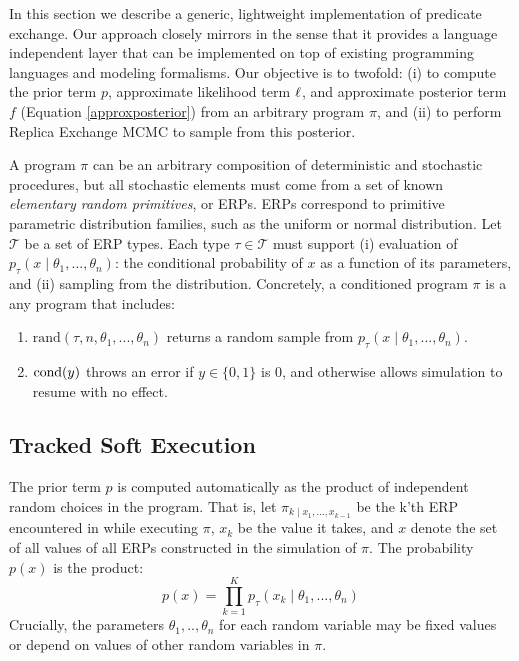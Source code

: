
In this section we describe a generic, lightweight implementation of predicate exchange.
Our approach closely mirrors \citep{wingate2011lightweight, milch20071} in the sense that it provides a language independent layer that can be implemented on top of existing programming languages and modeling formalisms.
Our objective is to twofold: (i) to compute the prior term $p$, approximate likelihood term $\operatorname{\ell}$, and approximate posterior term $f$ (Equation \ref{approxposterior}) from an arbitrary program $\pi$, and (ii) to perform Replica Exchange MCMC to sample from this posterior.

A program $\pi$ can be an arbitrary composition of deterministic and stochastic procedures, but all stochastic elements must come from a set of known \emph{elementary random primitives}, or ERPs.
ERPs correspond to primitive parametric distribution families, such as the uniform or normal distribution.
Let $\mathcal{T}$ be a set of ERP types.
Each type $\tau \in \mathcal{T}$ must support (i) evaluation of $p_\tau(x \mid \theta_1, ..., \theta_n)$: the conditional probability of $x$ as a function of its parameters, and (ii) sampling from the distribution.
Concretely, a conditioned program $\pi$ is a any program that includes:

\begin{enumerate}
  \item $\textrm{rand}(\tau, n, \theta_1, ...,\theta_n)$ returns a random sample from $p_\tau(x \mid \theta_1, ..., \theta_n)$.
  \item $\operatorname{cond}(y)$ throws an error if $y \in \{0, 1\}$ is 0, and otherwise allows simulation to resume with no effect.
\end{enumerate}



\subsection{Tracked Soft Execution}
The prior term $p$ is computed automatically as the product of independent random choices in the program. 
That is, let $\pi_{k \mid x_1, ..., x_{k-1}}$ be the k'th ERP encountered in while executing $\pi$, $x_k$ be the value it takes, and $x$ denote the set of all values of all ERPs constructed in the simulation of $\pi$.
The probability $p(x)$ is the product:
\begin{equation}\label{productprob}
p(x) = \prod_{k=1}^K p_\tau(x_k \mid \theta_1,..., \theta_n )
\end{equation}
Crucially, the parameters $\theta_1,..,\theta_n$ for each random variable may be fixed values or depend on values of other random variables in $\pi$.


